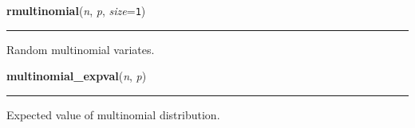    \begin{boxedminipage}{\textwidth}

    \raggedright \textbf{rmultinomial}(\textit{n}, \textit{p}, \textit{size}=\texttt{1})

    \vspace{-1.5ex}

    \rule{\textwidth}{0.5\fboxrule}

Random multinomial variates.
    \vspace{1ex}

    \end{boxedminipage}

    \label{pymc:distributions:multinomial_expval}

    \vspace{0.5ex}

    \begin{boxedminipage}{\textwidth}

    \raggedright \textbf{multinomial\_expval}(\textit{n}, \textit{p})

    \vspace{-1.5ex}

    \rule{\textwidth}{0.5\fboxrule}

Expected value of multinomial distribution.
    \vspace{1ex}

    \end{boxedminipage}

    \label{pymc:distributions:multinomial_like}

    \vspace{0.5ex}

